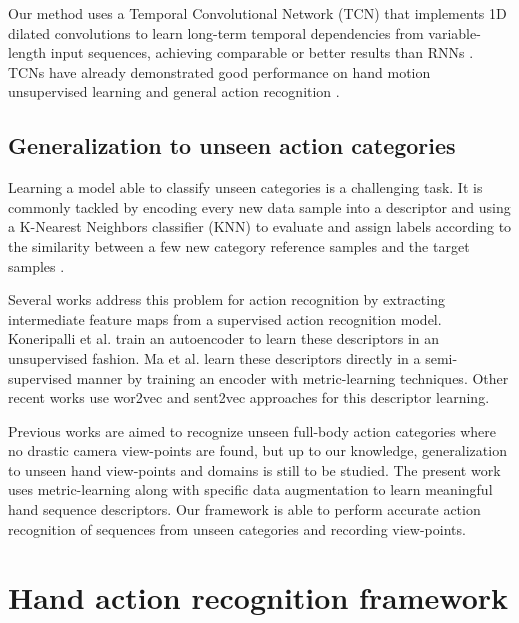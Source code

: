\documentclass[letterpaper, 10 pt, conference]{ieeeconf}
\begin{document}
Our method uses a Temporal Convolutional Network (TCN) \cite{bai2018empirical, oord2016wavenet} that implements 1D dilated convolutions to learn long-term temporal dependencies from variable-length input sequences, achieving comparable or better results than RNNs \cite{bai2018empirical}. TCNs  have already demonstrated good performance on hand motion unsupervised learning \cite{koneripalli2020rate} and general action recognition \cite{sabater2021oneshot, kim2017interpretable}.





\subsection{Generalization to unseen action categories}


Learning a model able to classify unseen categories is a challenging task. It is commonly tackled by encoding every new data sample into a descriptor and using a K-Nearest Neighbors classifier (KNN) to evaluate and assign labels according to the similarity between a few new category reference samples and the target samples \cite{wang2019simpleshot}.



Several works \cite{liu2019ntu,sabater2021oneshot} address this problem for action recognition by extracting intermediate feature maps from a supervised action recognition model.
Koneripalli et al. \cite{koneripalli2020rate} train an autoencoder to learn these descriptors in an unsupervised fashion. Ma et al. 
\cite{ma2020skeleton} learn these descriptors directly in a semi-supervised manner by training an encoder with metric-learning techniques.
Other recent works use wor2vec \cite{hahn2019action2vec} and sent2vec \cite{jasani2019skeleton} approaches for this descriptor learning.

Previous works \cite{liu2019ntu,hahn2019action2vec,jasani2019skeleton} are aimed to recognize unseen full-body action categories where no drastic camera view-points are found, but up to our knowledge, generalization to unseen hand view-points and domains is still to be studied.
The present work uses metric-learning along with specific data augmentation to learn meaningful hand sequence descriptors. Our framework is able to perform accurate action recognition of sequences from unseen categories and recording view-points.




\section{Hand action recognition framework}
\end{document}
